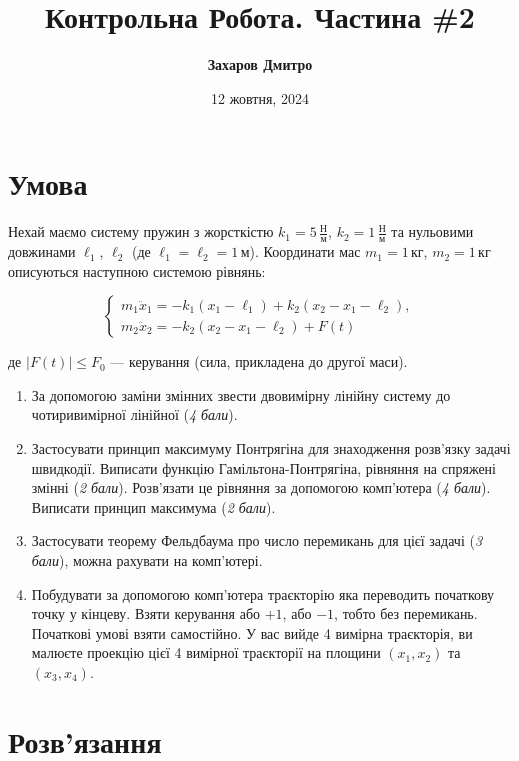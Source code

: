 \documentclass{hw_template}
\title{\bfseries Контрольна Робота. Частина \#2}
\author{\bfseries Захаров Дмитро}
\date{12 жовтня, 2024}
\begin{document}
\pagestyle{fancy}

\maketitle

\section{Умова}

Нехай маємо систему пружин з жорсткістю $k_1=5\,\frac{\text{Н}}{\text{м}}$, $k_2 = 1\,\frac{\text{Н}}{\text{м}}$ та нульовими довжинами $\ell_1$, $\ell_2$ (де $\ell_1=\ell_2=1 \, \text{м}$). Координати мас $m_1 = 1\,\text{кг}$, $m_2 = 1\,\text{кг}$ описуються наступною системою рівнянь:

\begin{equation*}
    \begin{cases}
        m_1\ddot{x}_1 = -k_1(x_1 - \ell_1) + k_2(x_2 - x_1 - \ell_2), \\
        m_2\ddot{x}_2 = -k_2(x_2 - x_1 - \ell_2) + F(t)
    \end{cases}
\end{equation*}

де $|F(t)| \leq F_0$ --- керування (сила, прикладена до другої маси). 

\begin{enumerate}
    \item За допомогою заміни змінних звести двовимірну лінійну систему до чотиривимірної лінійної (\emph{4 бали}).
    \item Застосувати принцип максимуму Понтрягіна для знаходження
    розв’язку задачі швидкодії. Виписати функцію Гамільтона-Понтрягіна,
    рівняння на спряжені змінні (\emph{2 бали}). Розв’язати це рівняння за
    допомогою комп’ютера (\emph{4 бали}). Виписати принцип максимума (\emph{2 бали}).
    \item Застосувати теорему Фельдбаума про число перемикань для цієї задачі
    (\emph{3 бали}), можна рахувати на комп’ютері.
    \item Побудувати за допомогою комп’ютера траєкторію яка переводить початкову точку у кінцеву. Взяти керування або $+1$, або $-1$, тобто без
    перемикань. Початкові умові взяти самостійно. У вас вийде 4 вимірна
    траєкторія, ви малюєте проекцію цієї 4 вимірної траєкторії на площини
    $(x_1,x_2)$ та $(x_3,x_4)$.
\end{enumerate}

\pagebreak
\section{Розв'язання}
\end{document}
